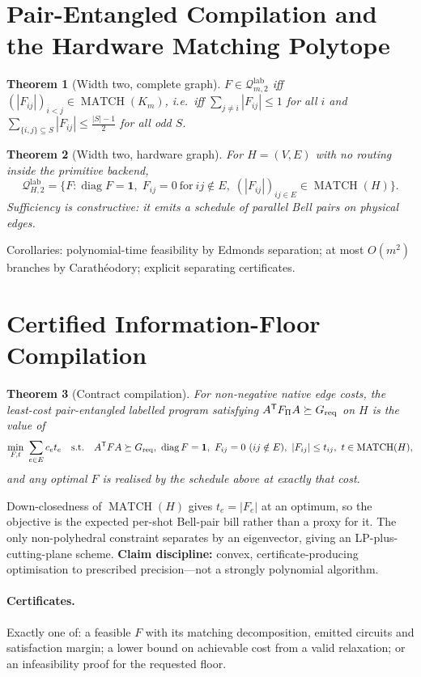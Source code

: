 \documentclass[11pt]{article}
\newtheorem{theorem}{Theorem}
\begin{document}
\section{Pair-Entangled Compilation and the Hardware Matching Polytope}
\begin{theorem}[Width two, complete graph]
$F\in\mathcal Q^{\mathrm{lab}}_{m,2}$ iff
$(|F_{ij}|)_{i<j}\in\operatorname{MATCH}(K_m)$, i.e.\ iff
$\sum_{j\neq i}|F_{ij}|\le1$ for all $i$ and
$\sum_{\{i,j\}\subseteq S}|F_{ij}|\le\frac{|S|-1}2$ for all odd $S$.
\end{theorem}
\begin{theorem}[Width two, hardware graph]
For $H=(V,E)$ with no routing inside the primitive backend,
\[
\mathcal Q^{\mathrm{lab}}_{H,2}
=\Big\{F:\operatorname{diag}F=\bm1,\;F_{ij}=0\ \text{for}\ ij\notin E,\;
(|F_{ij}|)_{ij\in E}\in\operatorname{MATCH}(H)\Big\}.
\]
Sufficiency is constructive: it emits a schedule of parallel Bell pairs on physical edges.
\end{theorem}
Corollaries: polynomial-time feasibility by Edmonds separation; at most $O(m^2)$ branches by
Carath\'eodory; explicit separating certificates.

\section{Certified Information-Floor Compilation}
\begin{theorem}[Contract compilation]
For non-negative native edge costs, the least-cost pair-entangled labelled program satisfying
$A^{\mathsf T}F_\Pi A\succeq G_{\rm req}$ on $H$ is the value of
\[
\min_{F,t}\ \sum_{e\in E}c_et_e
\quad\text{s.t.}\quad
A^{\mathsf T}FA\succeq G_{\rm req},\
\operatorname{diag}F=\bm1,\
F_{ij}=0\ (ij\notin E),\
|F_{ij}|\le t_{ij},\
t\in\operatorname{MATCH}(H),
\]
and any optimal $F$ is realised by the schedule above at exactly that cost.
\end{theorem}
Down-closedness of $\operatorname{MATCH}(H)$ gives $t_e=|F_e|$ at an optimum, so the objective
is the expected per-shot Bell-pair bill rather than a proxy for it. The only non-polyhedral
constraint separates by an eigenvector, giving an LP-plus-cutting-plane scheme. \textbf{Claim
discipline:} convex, certificate-producing optimisation to prescribed precision---not a
strongly polynomial algorithm.

\paragraph{Certificates.} Exactly one of: a feasible $F$ with its matching decomposition,
emitted circuits and satisfaction margin; a lower bound on achievable cost from a valid
relaxation; or an infeasibility proof for the requested floor.
\end{document}
